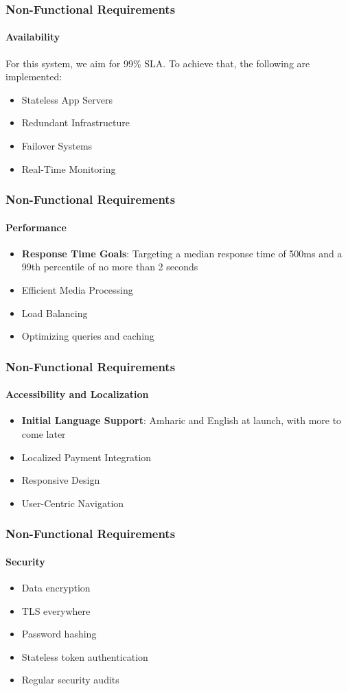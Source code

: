 \documentclass{beamer}
\begin{document}
\begin{frame}
	\frametitle{Non-Functional Requirements}
	\framesubtitle{Availability}
	For this system, we aim for 99\% SLA. To achieve that, the following
	are implemented:
	\begin{itemize}
		\item Stateless App Servers
		\item Redundant Infrastructure
		\item Failover Systems
		\item Real-Time Monitoring
	\end{itemize}
\end{frame}

\begin{frame}
	\frametitle{Non-Functional Requirements}
	\framesubtitle{Performance}
	\begin{itemize}
		\item \textbf{Response Time Goals}: Targeting a median response time of 500ms and a 99th
		      percentile of no more than 2 seconds
		\item Efficient Media Processing
		\item Load Balancing
		\item Optimizing queries and caching
	\end{itemize}
\end{frame}

\begin{frame}
	\frametitle{Non-Functional Requirements}
	\framesubtitle{Accessibility and Localization}
	\begin{itemize}
		\item \textbf{Initial Language Support}: Amharic and English at launch,
		      with more to come later
		\item Localized Payment Integration
		\item Responsive Design
		\item User-Centric Navigation
	\end{itemize}
\end{frame}

\begin{frame}
	\frametitle{Non-Functional Requirements}
	\framesubtitle{Security}
	\begin{itemize}
		\item Data encryption
		\item TLS everywhere
		\item Password hashing
		\item Stateless token authentication
		\item Regular security audits
	\end{itemize}
\end{frame}
\end{document}
